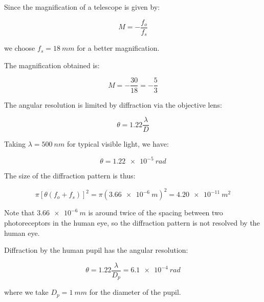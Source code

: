 \documentclass[12pt]{article}
\begin{document}



\pagebreak
\section*{}



Since the magnification of a telescope is given by:

\begin{equation}
    M = -\frac{f_{o}}{f_{s}}
\end{equation}

we choose $f_{s} = \qty{18}{mm}$ for a better magnification.

The magnification obtained is:

\begin{equation}
    M = -\frac{30}{18} = -\frac{5}{3}
\end{equation}


The angular resolution is limited by diffraction via the objective lens:

\begin{equation}
    \theta = 1.22 \frac{\lambda}{D}
\end{equation}

Taking $\lambda = \qty{500}{nm}$ for typical visible light, we have:

\begin{equation}
    \theta = \qty{1.22e-5}{rad}
\end{equation}

The size of the diffraction pattern is thus:

\begin{equation}
    \pi [\theta (f_{o} + f_{s})]^{2} = \pi (\qty{3.66e-6}{m})^{2} = \qty{4.20e-11}{m^{2}}
\end{equation}

Note that $\qty{3.66e-6}{m}$ is around twice of the spacing between two photoreceptors in the human eye, so the diffraction pattern is not resolved by the human eye.

Diffraction by the human pupil has the angular resolution:

\begin{equation}
    \theta = 1.22 \frac{\lambda}{D_{p}} = \qty{6.1e-4}{rad}
\end{equation}

where we take $D_{p} = \qty{1}{mm}$ for the diameter of the pupil.
\end{document}
